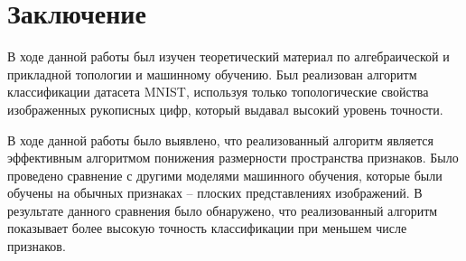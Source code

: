 \chapter*{Заключение}
В ходе данной работы был изучен теоретический материал по алгебраической и прикладной топологии и машинному обучению. Был реализован алгоритм классификации датасета MNIST, используя только топологические свойства изображенных рукописных цифр, который выдавал высокий уровень точности.

В ходе данной работы было выявлено, что реализованный алгоритм является эффективным алгоритмом понижения размерности пространства признаков. Было проведено сравнение с другими моделями машинного обучения, которые были обучены на обычных признаках -- плоских представлениях изображений. В результате данного сравнения было обнаружено, что реализованный алгоритм показывает более высокую точность классификации при меньшем числе признаков.
